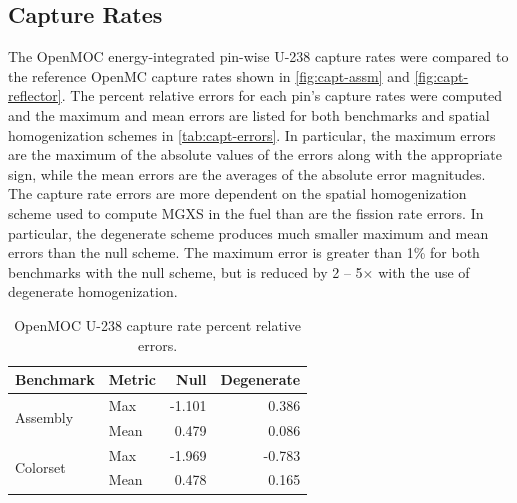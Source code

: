 \subsection{Capture Rates}
\label{subsec:capt-rates}

The OpenMOC energy-integrated pin-wise U-238 capture rates were compared to the reference OpenMC capture rates shown in \autoref{fig:capt-assm} and \autoref{fig:capt-reflector}. The percent relative errors for each pin's capture rates were computed and the maximum and mean errors are listed for both benchmarks and spatial homogenization schemes in \autoref{tab:capt-errors}. In particular, the maximum errors are the maximum of the absolute values of the errors along with the appropriate sign, while the mean errors are the averages of the absolute error magnitudes. The capture rate errors are more dependent on the spatial homogenization scheme used to compute MGXS in the fuel than are the fission rate errors. In particular, the degenerate scheme produces much smaller maximum and mean errors than the null scheme. The maximum error is greater than 1\% for both benchmarks with the null scheme, but is reduced by 2 -- 5$\times$ with the use of degenerate homogenization.

\begin{table}[h!]
  \centering
  \caption{OpenMOC U-238 capture rate percent relative errors.}
  \label{tab:capt-errors} 
  \begin{tabular}{l l r r}
  \toprule
  \textbf{Benchmark} & \textbf{Metric} & \textbf{Null} & \textbf{Degenerate} \\
  \midrule
  \multirow{2}{*}{Assembly} & Max  & -1.101 &  0.386 \\
                            & Mean &  0.479 &  0.086 \\
  \midrule
  \multirow{2}{*}{Colorset} & Max  & -1.969 & -0.783 \\
                            & Mean &  0.478 &  0.165 \\
  \bottomrule
\end{tabular}
\end{table}

